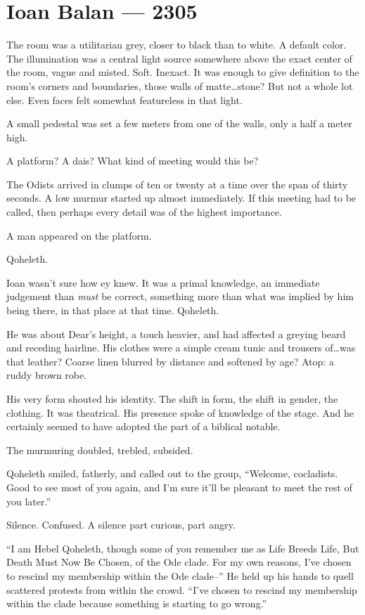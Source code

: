 \hypertarget{ioan-balan-2305}{%
\chapter*{Ioan Balan — 2305}\label{ioan-balan-2305}}

The room was a utilitarian grey, closer to black than to white. A default color. The illumination was a central light source somewhere above the exact center of the room, vague and misted. Soft. Inexact. It was enough to give definition to the room's corners and boundaries, those walls of matte\ldots{}stone? But not a whole lot else. Even faces felt somewhat featureless in that light.

A small pedestal was set a few meters from one of the walls, only a half a meter high.

A platform? A dais? What kind of meeting would this be?

The Odists arrived in clumps of ten or twenty at a time over the span of thirty seconds. A low murmur started up almost immediately. If this meeting had to be called, then perhaps every detail was of the highest importance.

A man appeared on the platform.

Qoheleth.

Ioan wasn't sure how ey knew. It was a primal knowledge, an immediate judgement than \emph{must} be correct, something more than what was implied by him being there, in that place at that time. Qoheleth.

He was about Dear's height, a touch heavier, and had affected a greying beard and receding hairline. His clothes were a simple cream tunic and trousers of\ldots{}was that leather? Coarse linen blurred by distance and softened by age? Atop: a ruddy brown robe.

His very form shouted his identity. The shift in form, the shift in gender, the clothing. It was theatrical. His presence spoke of knowledge of the stage. And he certainly seemed to have adopted the part of a biblical notable.

The murmuring doubled, trebled, subsided.

Qoheleth smiled, fatherly, and called out to the group, ``Welcome, cocladists. Good to see most of you again, and I'm sure it'll be pleasant to meet the rest of you later.''

Silence. Confused. A silence part curious, part angry.

``I am Hebel Qoheleth, though some of you remember me as Life Breeds Life, But Death Must Now Be Chosen, of the Ode clade. For my own reasons, I've chosen to rescind my membership within the Ode clade--'' He held up his hands to quell scattered protests from within the crowd. ``I've chosen to rescind my membership within the clade because something is starting to go wrong.''

